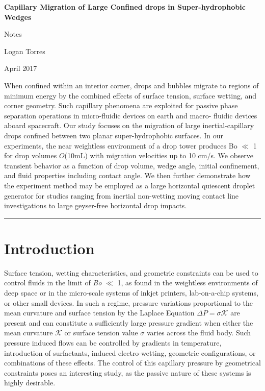 \documentclass{article}
\begin{document}
\begin{center}
\huge\textbf{Capillary Migration of Large Confined drops in Super-hydrophobic Wedges}
\end{center} 

\begin{center}
\large Notes

\Large Logan Torres

\large April 2017
\end{center}

\noindent When confined within an interior corner, drops and bubbles
migrate to regions of minimum energy by the combined effects of surface tension,
surface wetting, and corner geometry. Such capillary phenomena are exploited for
passive phase separation operations in micro-fluidic devices on earth and macro-
fluidic devices aboard spacecraft. Our study focuses on the migration of large
inertial-capillary drops confined between two planar super-hydrophobic surfaces. In
our experiments, the near weightless environment of a drop tower produces Bo $\ll$ 1
for drop volumes $O$(10mL) with migration velocities up to 10 cm/s. We observe
transient behavior as a function of drop volume, wedge angle, initial
confinement, and fluid properties including contact angle. We then further demonstrate
how the experiment method may be employed as a large horizontal quiescent
droplet generator for studies ranging from inertial non-wetting moving contact line
investigations to large geyser-free horizontal drop impacts.

\hspace*{200pt}

\hrule
\section*{Introduction}
Surface tension, wetting characteristics, and geometric constraints can be used to control fluids in the limit of \textit{Bo} $\ll$ 1, as found in the weightless environments of deep space or in the micro-scale systems of inkjet printers, lab-on-a-chip systems, or other small devices.  In such a regime, pressure variations proportional to the mean curvature and surface tension by the Laplace Equation $\Delta P = \sigma \mathcal{K} $ are present and can constitute a sufficiently large pressure gradient when either the mean curvature $\mathcal{K}$ or surface tension value $\sigma$ varies across the fluid body. Such pressure induced flows can be controlled by gradients in temperature, introduction of surfactants, induced electro-wetting, geometric configurations, or combinations of these effects. The control of this capillary pressure by geometrical constraints poses an interesting study, as the passive nature of these systems is highly desirable. 
\end{document}
